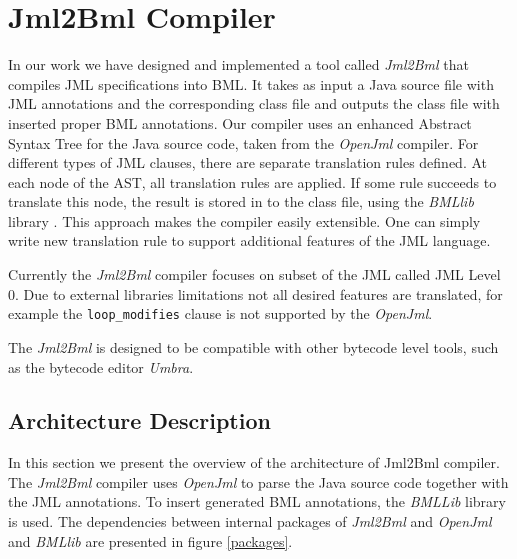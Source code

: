 \documentclass{acm_proc_article-sp}
\begin{document}
\section{Jml2Bml Compiler}
In our work we have designed and implemented a tool called \textit{Jml2Bml} that compiles JML specifications into BML. It takes as input a Java source file with JML annotations and the corresponding class file and outputs the class file with inserted proper BML annotations. Our compiler uses an enhanced Abstract Syntax Tree for the Java source code, taken from the \textit{OpenJml} compiler. For different types of JML clauses, there are separate translation rules defined. At each node of the AST, all translation rules are applied. If some rule succeeds to translate this node, the result is stored in to the class file, using the \textit {BMLlib} library \cite{bmllib}. This approach makes the compiler easily extensible. One can simply write new translation rule to support additional features of the JML language.

Currently the \textit{Jml2Bml} compiler focuses on subset of the JML called JML Level 0. Due to external libraries limitations not all desired features are translated, for example the \texttt{loop\_modifies} clause is not supported by the \textit{OpenJml}.

The \textit{Jml2Bml} is designed to be compatible with other bytecode level tools, such as the bytecode editor \textit{Umbra}.
\subsection{Architecture Description}
In this section we present the overview of the architecture of Jml2Bml compiler. The \textit{Jml2Bml} compiler uses \textit{OpenJml} to parse the Java source code together with the JML annotations. To insert generated BML annotations, the \textit{BMLLib} library is used. The dependencies between internal packages of \textit{Jml2Bml} and \textit{OpenJml} and \textit{BMLlib} are presented in figure \ref{packages}.
\end{document}
